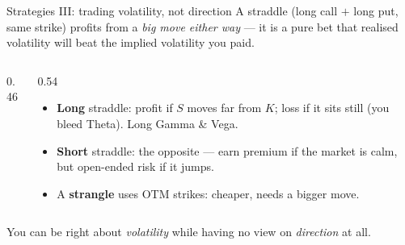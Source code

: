 \documentclass[11pt,aspectratio=169]{beamer}
\newcommand{\strike}{K}
\newcommand{\und}{S}                         %
\newcommand{\keybox}[1]{%
  \begin{beamercolorbox}[wd=\textwidth,sep=0.6em,rounded=true]{}%
    \colorbox{soft}{\parbox{\dimexpr\textwidth-1.4em}{\color{ink}#1}}%
  \end{beamercolorbox}}
\begin{document}
\begin{frame}{Strategies III: trading volatility, not direction}
  A \alert{straddle} (long call $+$ long put, same strike) profits from a
  \emph{big move either way} — it is a pure bet that realised volatility
  will beat the implied volatility you paid.
  \vspace{0.2em}
  \begin{columns}[c]
    \begin{column}{0.46\textwidth}
      \\[-0.1em]
    \end{column}
    \begin{column}{0.54\textwidth}
      \begin{itemize}\small
        \item \textbf{Long} straddle: profit if $\und$ moves far from $\strike$; loss if it sits still (you bleed Theta). Long Gamma \& Vega.
        \item \textbf{Short} straddle: the opposite — earn premium if the market is calm, but open-ended risk if it jumps.
        \item A \textbf{strangle} uses OTM strikes: cheaper, needs a bigger move.
      \end{itemize}
    \end{column}
  \end{columns}
  \vspace{0.2em}
  \keybox{You can be right about \emph{volatility} while having no view on \emph{direction} at all.}
\end{frame}
\end{document}
